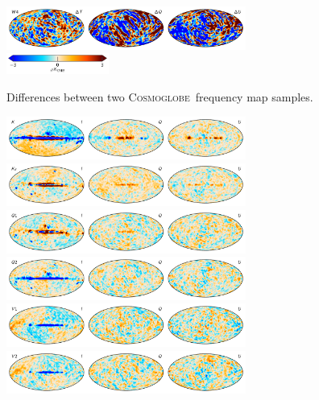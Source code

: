 \documentclass[twocolumn]{../../common/aa}
\newcommand{\cosmoglobe}{\textsc{Cosmoglobe}}
\begin{document}
\begin{figure}
	\includegraphics[width=0.7\textwidth]{figures/090-WMAP_W4_sampdiff.pdf}\\
	\includegraphics[width=0.30\textwidth]{figures/cbar_3uK.pdf}
	\caption{Differences between two \cosmoglobe\ frequency map samples.}
        \label{fig:sampdiff}
\end{figure}
\begin{figure}
	\centering
	\includegraphics[width=0.7\textwidth]{figures/tod_res_K_IQU.pdf}\\
	\includegraphics[width=0.7\textwidth]{figures/tod_res_Ka_IQU.pdf}\\
	\includegraphics[width=0.7\textwidth]{figures/tod_res_Q1_IQU.pdf}\\
	\includegraphics[width=0.7\textwidth]{figures/tod_res_Q2_IQU.pdf}\\
	\includegraphics[width=0.7\textwidth]{figures/tod_res_V1_IQU.pdf}\\
	\includegraphics[width=0.7\textwidth]{figures/tod_res_V2_IQU.pdf}\\

\end{figure}
\end{document}
